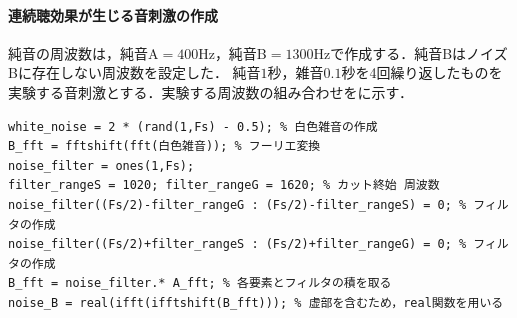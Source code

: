 \paragraph{連続聴効果が生じる音刺激の作成}純音の周波数は，純音A\(=400\textrm{Hz}\)，純音B\(=1300\textrm{Hz}\)で作成する．純音BはノイズBに存在しない周波数を設定した．
純音\(1\)秒，雑音\(0.1\)秒を4回繰り返したものを実験する音刺激とする．実験する周波数の組み合わせをに示す．\scall{}
\begin{lstlisting}[caption={白色雑音の作成},label={src:白色雑音の作成}]
white_noise = 2 * (rand(1,Fs) - 0.5); % 白色雑音の作成
B_fft = fftshift(fft(白色雑音)); % フーリエ変換
noise_filter = ones(1,Fs);
filter_rangeS = 1020; filter_rangeG = 1620; % カット終始 周波数
noise_filter((Fs/2)-filter_rangeG : (Fs/2)-filter_rangeS) = 0; % フィルタの作成
noise_filter((Fs/2)+filter_rangeS : (Fs/2)+filter_rangeG) = 0; % フィルタの作成
B_fft = noise_filter.* A_fft; % 各要素とフィルタの積を取る
noise_B = real(ifft(ifftshift(B_fft))); % 虚部を含むため，real関数を用いる
\end{lstlisting}
